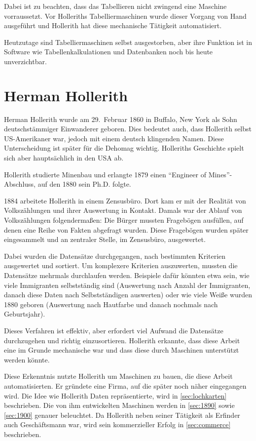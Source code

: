 \documentclass[parskip=half]{scrartcl}
\begin{document}
Dabei ist zu beachten, dass das Tabellieren nicht zwingend eine Maschine
vorraussetzt. Vor Holleriths Tabelliermaschinen wurde dieser Vorgang von Hand
ausgeführt und Hollerith hat diese mechanische Tätigkeit automatisiert.

Heutzutage sind Tabelliermaschinen selbst ausgestorben, aber ihre Funktion ist
in Software wie Tabellenkalkulationen und Datenbanken noch bis heute
unverzichtbar.

\section{Herman Hollerith}
\label{sec:hollerith}

Herman Hollerith wurde am 29.~Februar 1860 in Buffalo, New York als Sohn
deutschstämmiger Einwanderer geboren. Dies bedeutet auch, dass Hollerith selbst
US-Amerikaner war, jedoch mit einem deutsch klingenden Namen. Diese
Unterscheidung ist später für die Dehomag wichtig. Holleriths Geschichte spielt
sich aber hauptsächlich in den USA ab.

Hollerith studierte Minenbau und erlangte 1879 einen \enquote{Engineer of
Mines}-Abschluss, auf den 1880 sein Ph.D. folgte.

1884 arbeitete Hollerith in einem Zensusbüro. Dort kam er mit der Realität von
Volkszählungen und ihrer Auswertung in Kontakt. Damals war der Ablauf von
Volkszählungen folgendermaßen: Die Bürger mussten Fragebögen ausfüllen, auf
denen eine Reihe von Fakten abgefragt wurden. Diese Fragebögen wurden später
eingesammelt und an zentraler Stelle, im Zensusbüro, ausgewertet.

Dabei wurden die Datensätze durchgegangen, nach bestimmten Kriterien
ausgewertet und sortiert. Um komplexere Kriterien auszuwerten, mussten die
Datensätze mehrmals durchlaufen werden. Beispiele dafür könnten etwa sein, wie viele
Immigranten selbstständig sind (Auswertung nach Anzahl der Immigranten, danach
diese Daten nach Selbstständigen auswerten) oder wie viele Weiße wurden 1880
geboren (Auswertung nach Hautfarbe und danach nochmals nach Geburtsjahr).

Dieses Verfahren ist effektiv, aber erfordert viel Aufwand die Datensätze
durchzugehen und richtig einzusortieren. Hollerith erkannte, dass diese Arbeit
eine im Grunde mechanische war und dass diese durch Maschinen unterstützt
werden könnte.

Diese Erkenntnis nutzte Hollerith um Maschinen zu bauen, die diese Arbeit
automatisierten. Er gründete eine Firma, auf die später noch näher eingegangen
wird. Die Idee wie Hollerith Daten repräsentierte, wird in
\autoref{sec:lochkarten} beschrieben. Die von ihm entwickelten Maschinen werden
in \autoref{sec:1890} sowie \autoref{sec:1900} genauer beleuchtet. Da Hollerith
neben seiner Tätigkeit als Erfinder auch Geschäftsmann war, wird sein
kommerzieller Erfolg in \autoref{sec:commerce} beschrieben.
\end{document}
